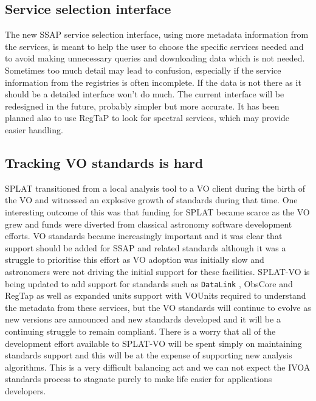 \documentclass[final,authoryear,5p,times,twocolumn]{elsarticle}
\begin{document}
\subsection{Service selection interface}

The new SSAP service selection interface, using more metadata
information from the services, is meant to help the user to choose the
specific services needed and to avoid making unnecessary queries and
downloading data which is not needed. Sometimes too much detail may
lead to confusion, especially if the service information from the
registries is often incomplete. If the data is not there as it should
be a detailed interface won't do much. The current interface will be
redesigned in the future, probably simpler but more accurate. It has
been planned also to use RegTaP \citep{regtap} to look for spectral services, which
may provide easier handling.

\subsection{Tracking VO standards is hard}

SPLAT transitioned from a local analysis tool to a VO client during
the birth of the VO and witnessed an explosive growth of standards
during that time. One interesting outcome of this was that funding for
SPLAT became scarce as the VO grew and funds were diverted from
classical astronomy software development efforts. VO standards became
increasingly important and it was clear that support should be added
for SSAP and related standards although it was a struggle to
prioritise this effort as VO adoption was initially slow and
astronomers were not driving the initial support for these
facilities. SPLAT-VO is being updated to add support for standards
such as \texttt{DataLink} \citep{datalink}, ObsCore \citep{obstap} and RegTap \citep{regtap} as well as expanded units support with
VOUnits \citep{vounits} required to understand the metadata from these
services, but the VO standards will continue to evolve
as new versions are announced and new standards developed and it will
be a continuing struggle to remain compliant. There is a worry that
all of the development effort available to SPLAT-VO will be spent
simply on maintaining standards support and this will be at the
expense of supporting new analysis algorithms. This is a very
difficult balancing act and we can not expect the IVOA standards
process to stagnate purely to make life easier for applications
developers.
\end{document}
